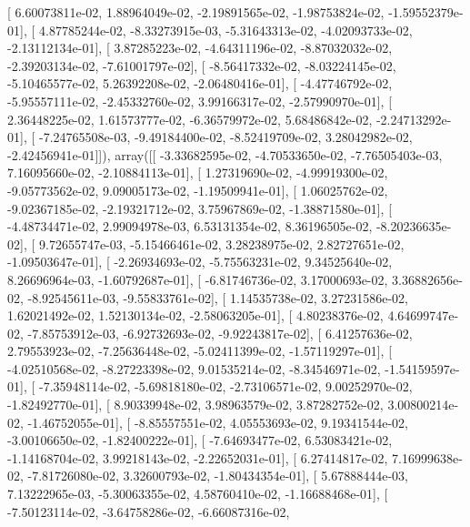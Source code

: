 \documentclass{article}
\begin{document}
       [  6.60073811e-02,   1.88964049e-02,  -2.19891565e-02,
         -1.98753824e-02,  -1.59552379e-01],
       [  4.87785244e-02,  -8.33273915e-03,  -5.31643313e-02,
         -4.02093733e-02,  -2.13112134e-01],
       [  3.87285223e-02,  -4.64311196e-02,  -8.87032032e-02,
         -2.39203134e-02,  -7.61001797e-02],
       [ -8.56417332e-02,  -8.03224145e-02,  -5.10465577e-02,
          5.26392208e-02,  -2.06480416e-01],
       [ -4.47746792e-02,  -5.95557111e-02,  -2.45332760e-02,
          3.99166317e-02,  -2.57990970e-01],
       [  2.36448225e-02,   1.61573777e-02,  -6.36579972e-02,
          5.68486842e-02,  -2.24713292e-01],
       [ -7.24765508e-03,  -9.49184400e-02,  -8.52419709e-02,
          3.28042982e-02,  -2.42456941e-01]]), array([[ -3.33682595e-02,  -4.70533650e-02,  -7.76505403e-03,
          7.16095660e-02,  -2.10884113e-01],
       [  1.27319690e-02,  -4.99919300e-02,  -9.05773562e-02,
          9.09005173e-02,  -1.19509941e-01],
       [  1.06025762e-02,  -9.02367185e-02,  -2.19321712e-02,
          3.75967869e-02,  -1.38871580e-01],
       [ -4.48734471e-02,   2.99094978e-03,   6.53131354e-02,
          8.36196505e-02,  -8.20236635e-02],
       [  9.72655747e-03,  -5.15466461e-02,   3.28238975e-02,
          2.82727651e-02,  -1.09503647e-01],
       [ -2.26934693e-02,  -5.75563231e-02,   9.34525640e-02,
          8.26696964e-03,  -1.60792687e-01],
       [ -6.81746736e-02,   3.17000693e-02,   3.36882656e-02,
         -8.92545611e-03,  -9.55833761e-02],
       [  1.14535738e-02,   3.27231586e-02,   1.62021492e-02,
          1.52130134e-02,  -2.58063205e-01],
       [  4.80238376e-02,   4.64699747e-02,  -7.85753912e-03,
         -6.92732693e-02,  -9.92243817e-02],
       [  6.41257636e-02,   2.79553923e-02,  -7.25636448e-02,
         -5.02411399e-02,  -1.57119297e-01],
       [ -4.02510568e-02,  -8.27223398e-02,   9.01535214e-02,
         -8.34546971e-02,  -1.54159597e-01],
       [ -7.35948114e-02,  -5.69818180e-02,  -2.73106571e-02,
          9.00252970e-02,  -1.82492770e-01],
       [  8.90339948e-02,   3.98963579e-02,   3.87282752e-02,
          3.00800214e-02,  -1.46752055e-01],
       [ -8.85557551e-02,   4.05553693e-02,   9.19341544e-02,
         -3.00106650e-02,  -1.82400222e-01],
       [ -7.64693477e-02,   6.53083421e-02,  -1.14168704e-02,
          3.99218143e-02,  -2.22652031e-01],
       [  6.27414817e-02,   7.16999638e-02,  -7.81726080e-02,
          3.32600793e-02,  -1.80434354e-01],
       [  5.67888444e-03,   7.13222965e-03,  -5.30063355e-02,
          4.58760410e-02,  -1.16688468e-01],
       [ -7.50123114e-02,  -3.64758286e-02,  -6.66087316e-02,
\end{document}

